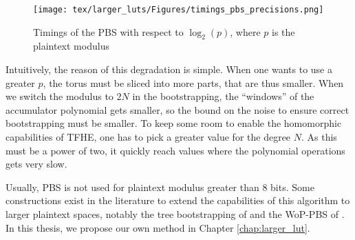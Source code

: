 \begin{figure}
	\centering
	\texttt{[image: tex/larger\_luts/Figures/timings\_pbs\_precisions.png]}
	\caption{Timings of the \gls{PBS} with respect to $\log_2(p)$, where $p$ is the plaintext modulus}
	\label{fig:PBS_perfs}
\end{figure}



Intuitively, the reason of this degradation is simple. When one wants to use a greater $p$, the torus must be sliced into more parts, that are thus smaller. When we switch the modulus to $2N$ in the bootstrapping, the ``windows'' of the accumulator polynomial gets smaller, so the bound on the noise to ensure correct bootstrapping must be smaller. To keep some room to enable the homomorphic capabilities of \gls{TFHE}, one has to pick a greater value for the degree $N$. As this must be a power of two, it quickly reach values where the polynomial operations gets very slow.

Usually, \gls{PBS} is not used for plaintext modulus greater than 8 bits. Some constructions exist in the literature to extend the capabilities of this algorithm to larger plaintext spaces, notably the tree bootstrapping of \cite{TCHES:GuiBorAra21} and the WoP-\gls{PBS} of \cite{AC:CLOT21}. In this thesis, we propose our own method in Chapter \ref{chap:larger_lut}.




